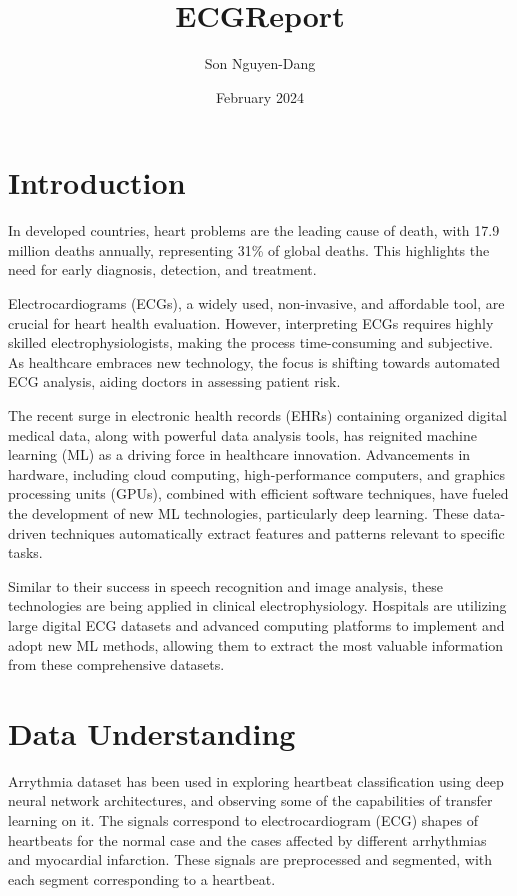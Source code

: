 \documentclass{article}
\title{ECGReport}
\author{Son Nguyen-Dang}
\date{February 2024}
\begin{document}
\maketitle
\newpage

\section{Introduction}
In developed countries, heart problems are the leading cause of death, with 17.9 million deaths annually, representing 31\% of global deaths. This highlights the need for early diagnosis, detection, and treatment.

Electrocardiograms (ECGs), a widely used, non-invasive, and affordable tool, are crucial for heart health evaluation. However, interpreting ECGs requires highly skilled electrophysiologists, making the process time-consuming and subjective. As healthcare embraces new technology, the focus is shifting towards automated ECG analysis, aiding doctors in assessing patient risk.

The recent surge in electronic health records (EHRs) containing organized digital medical data, along with powerful data analysis tools, has reignited machine learning (ML) as a driving force in healthcare innovation. Advancements in hardware, including cloud computing, high-performance computers, and graphics processing units (GPUs), combined with efficient software techniques, have fueled the development of new ML technologies, particularly deep learning. These data-driven techniques automatically extract features and patterns relevant to specific tasks.

Similar to their success in speech recognition and image analysis, these technologies are being applied in clinical electrophysiology. Hospitals are utilizing large digital ECG datasets and advanced computing platforms to implement and adopt new ML methods, allowing them to extract the most valuable information from these comprehensive datasets.

\section{Data Understanding}
Arrythmia dataset has been used in exploring heartbeat classification using deep neural network architectures, and observing some of the capabilities of transfer learning on it. The signals correspond to electrocardiogram (ECG) shapes of heartbeats for the normal case and the cases affected by different arrhythmias and myocardial infarction. These signals are preprocessed and segmented, with each segment corresponding to a heartbeat.
\end{document}
